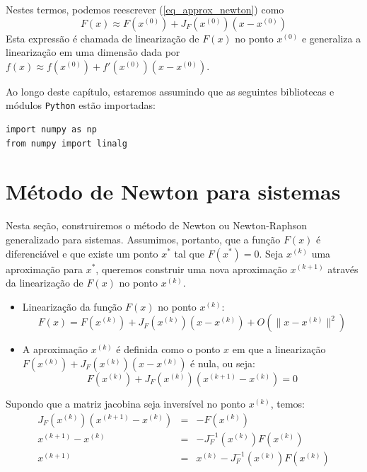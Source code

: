 Nestes termos, podemos reescrever (\ref{eq_approx_newton}) como
$$F(x)\approx F(x^{(0)}) + J_F(x^{(0)}) (x-x^{(0)})$$
Esta expressão é chamada de linearização de $F(x)$ no ponto $x^{(0)}$ e generaliza a linearização em uma dimensão dada por $f(x)\approx f(x^{(0)})+f'(x^{(0)}) (x-x^{(0)})$.

\ifispython
Ao longo deste capítulo, estaremos assumindo que as seguintes bibliotecas e módulos \verb+Python+ estão importadas:
\begin{verbatim}
import numpy as np
from numpy import linalg
\end{verbatim}
\fi

\section{Método de  Newton para sistemas}

Nesta seção, construiremos o método de Newton ou Newton-Raphson generalizado para sistemas. Assumimos, portanto, que a função $F(x)$ é diferenciável e que existe um ponto $x^*$ tal que $F(x^*)=0$. Seja $x^{(k)}$ uma aproximação para $x^*$, queremos construir uma nova aproximação $x^{(k+1)}$ através da linearização de $F(x)$ no ponto $x^{(k)}$.

\begin{itemize}
\item Linearização da função $F(x)$ no ponto $x^{(k)}$: 
  \begin{equation*}
F(x)= F(x^{(k)})+ J_F\left(x^{(k)}\right) \left(x-x^{(k)}\right)  + O\left(\|x-x^{(k)}\|^2\right)    
  \end{equation*}
\item A aproximação $x^{(k)}$ é definida como o ponto $x$ em que a linearização $F(x^{(k)})+ J_F\left(x^{(k)}\right) \left(x-x^{(k)}\right)$ é nula, ou seja:
$$F(x^{(k)})+ J_F\left(x^{(k)}\right) \left(x^{(k+1)}-x^{(k)}\right)=0$$
\end{itemize}

Supondo que a matriz jacobina seja inversível no ponto $x^{(k)}$, temos:
\begin{eqnarray*}
J_F\left(x^{(k)}\right) \left(x^{(k+1)}-x^{(k)}\right)&=&-F(x^{(k)})\\
x^{(k+1)}-x^{(k)}&=&-J_F^{-1}\left(x^{(k)}\right)F(x^{(k)})\\
x^{(k+1)}&=&x^{(k)}-J_F^{-1}\left(x^{(k)}\right)F(x^{(k)})
\end{eqnarray*}

